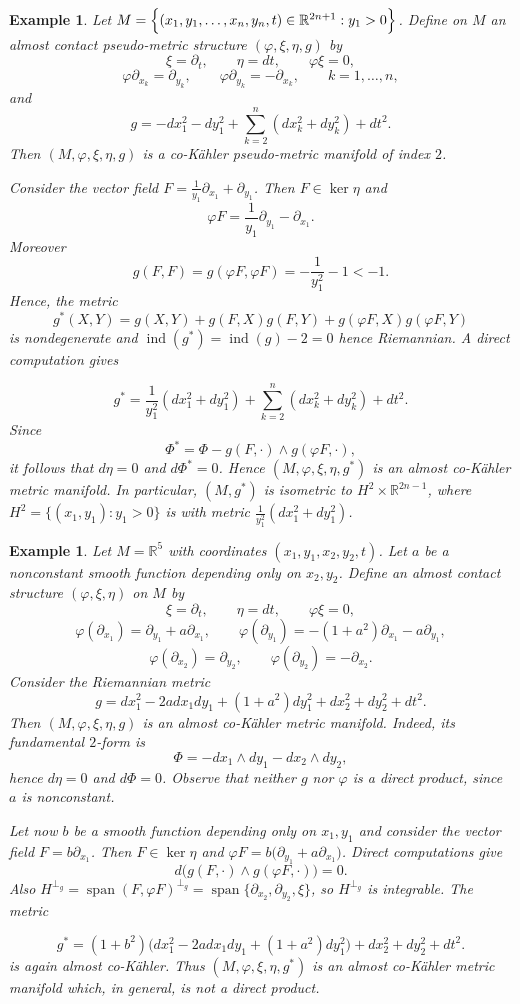 \documentclass[12pt,a4paper,final]{amsart}
\numberwithin{equation}{section}
\theoremstyle{df}
\newtheorem{ex}[tw]{Example}
\newcommand{\ind}{\operatorname{ind}}
\begin{document}
\begin{ex}
Let $M=\Bigl\{(x_1,y_1,\dots,x_n,y_n,t)\in \mathbb{R}^{2n+1}:y_1>0\Bigr\}$.
Define on $M$ an almost contact pseudo-metric structure $(\varphi,\xi,\eta,g)$ by
$$
\xi=\partial_t,\qquad \eta=dt,\qquad \varphi \xi=0,
$$
$$
\varphi \partial_{x_k}=\partial_{y_k},\qquad \varphi \partial_{y_k}=-\partial_{x_k},
\qquad k=1,\dots,n,
$$
and
$$
g=-dx_1^2-dy_1^2+\sum_{k=2}^n (dx_k^2+dy_k^2)+dt^2.
$$
Then $(M,\varphi,\xi,\eta,g)$ is a co-K\"ahler pseudo-metric manifold of index $2$.

Consider the vector field $F=\frac{1}{y_1}\partial_{x_1}+\partial_{y_1}$.
Then $F\in \ker\eta$ and
$$
\varphi F=\frac{1}{y_1}\partial_{y_1}-\partial_{x_1}.
$$
Moreover
$$
g(F,F)=g(\varphi F,\varphi F)=-\frac{1}{y_1^2}-1<-1.
$$
Hence, the metric
$$
g^\ast(X,Y)=g(X,Y)+g(F,X)g(F,Y)+g(\varphi F,X)g(\varphi F,Y)
$$
is nondegenerate and $\ind(g^\ast)=\ind(g)-2=0$ hence Riemannian.
A direct computation gives

$$
g^\ast=\frac{1}{y_1^2}(dx_1^2+dy_1^2)+\sum_{k=2}^n (dx_k^2+dy_k^2)+dt^2.
$$
Since
$$
\Phi^\ast=\Phi-g(F,\cdot)\wedge g(\varphi F,\cdot),
$$
it follows that $d\eta=0$ and $d\Phi^\ast=0$. Hence $(M,\varphi,\xi,\eta,g^\ast)$ is an almost co-K\"ahler metric manifold. In particular, $(M,g^\ast)$ is isometric to
$H^2\times \mathbb{R}^{2n-1}$, where $H^2=\{(x_1,y_1):y_1>0\}$ is with metric $\frac{1}{y_1^2}(dx_1^2+dy_1^2)$.
\end{ex}

\begin{ex}
Let $M=\mathbb{R}^{5}$ with coordinates $(x_{1},y_{1},x_{2},y_{2},t)$. Let $a$ be a nonconstant smooth function depending only on $x_{2},y_{2}$. Define an almost contact structure $(\varphi,\xi,\eta)$ on $M$ by
$$
\xi=\partial_{t},\qquad \eta=dt,\qquad \varphi\xi=0,
$$
$$
\varphi(\partial_{x_{1}})=\partial_{y_{1}}+a\partial_{x_{1}},\qquad
\varphi(\partial_{y_{1}})=-(1+a^{2})\partial_{x_{1}}-a\partial_{y_{1}},
$$
$$
\varphi(\partial_{x_{2}})=\partial_{y_{2}},\qquad
\varphi(\partial_{y_{2}})=-\partial_{x_{2}}.
$$
Consider the Riemannian metric
$$
g=dx_{1}^{2}-2adx_{1}dy_{1}+(1+a^{2})dy_{1}^{2}+dx_{2}^{2}+dy_{2}^{2}+dt^{2}.
$$
Then $(M,\varphi,\xi,\eta,g)$ is an almost co-K\"ahler metric manifold. Indeed, its fundamental $2$-form is
$$
\Phi=-dx_{1}\wedge dy_{1}-dx_{2}\wedge dy_{2},
$$
hence $d\eta=0$ and $d\Phi=0$. Observe that neither $g$ nor $\varphi$ is a direct product, since $a$ is nonconstant.

Let now $b$ be a smooth function depending only on $x_{1},y_{1}$ and consider the vector field $F=b\partial_{x_{1}}$.
Then $F\in \ker\eta$ and $\varphi F=b\bigl(\partial_{y_{1}}+a\partial_{x_{1}}\bigr)$.
Direct computations give
$$
d\bigl(g(F,\cdot)\wedge g(\varphi F,\cdot)\bigr)=0.
$$
Also $H^{\perp_{g}}=\operatorname{span}(F,\varphi F)^{\perp_{g}}=\operatorname{span}\{\partial_{x_{2}},\partial_{y_{2}},\xi\}$,
so $H^{\perp_{g}}$ is integrable. The metric


$$
g^{\ast}=(1+b^{2})\bigl(dx_{1}^{2}-2adx_{1}dy_{1}+(1+a^{2})dy_{1}^{2}\bigr)+dx_{2}^{2}+dy_{2}^{2}+dt^{2}.
$$ is again almost co-K\"ahler.
Thus $(M,\varphi,\xi,\eta,g^{\ast})$ is an almost co-K\"ahler metric manifold which, in general, is not a direct product.
\end{ex}
\end{document}

